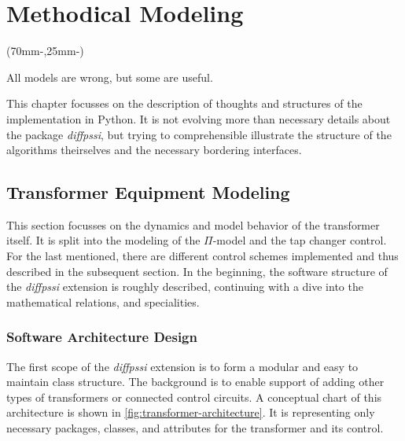 
\chapter{Methodical Modeling}
\label{chap:methodical-modeling}

\begin{textblock*}{.7\textwidth}(70mm-\offset,25mm-\offset)
        \begin{fquote}
            All models are wrong, but some are useful.
        \end{fquote}
\end{textblock*}

This chapter focusses on the description of thoughts and structures of the implementation in Python.
It is not evolving more than necessary details about the package {\itshape diffpssi}, but trying to comprehensible illustrate the structure of the algorithms theirselves and the necessary bordering interfaces.

\section{Transformer Equipment Modeling}
\label{sec:transformer-modeling}

This section focusses on the dynamics and model behavior of the transformer itself.
It is split into the modeling of the $\Pi$-model and the tap changer control.
For the last mentioned, there are different control schemes implemented and thus described in the subsequent section.
In the beginning, the software structure of the \textit{diffpssi} extension is roughly described, continuing with a dive into the mathematical relations, and specialities.  

\subsection{Software Architecture Design}
\label{sec:modeling-architecture}

The first scope of the \textit{diffpssi} extension is to form a modular and easy to maintain class structure. 
The background is to enable support of adding other types of transformers or connected control circuits.
A conceptual chart of this architecture is shown in \autoref{fig:transformer-architecture}.
It is representing only necessary packages, classes, and attributes for the transformer and its control.

